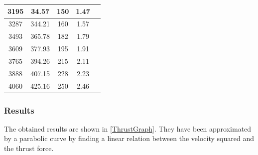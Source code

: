 \begin{table}[H]
\begin{tabular}{|c|c|c|c|p{4.3cm}|}
		\hline%
		3195 						       &  34.57			           & 150                      & 1.47         \\
		\hline%
		3287                               &  344.21  			               & 160                      & 1.57         \\
		\hline%
		3493                               &  365.78                          & 182                      & 1.79         \\
		\hline%
		3609 					           &  377.93	                       & 195                      & 1.91         \\
		\hline%
		3765 						       &  394.26	                   & 215                      & 2.11         \\
		\hline%
		3888 						       &  407.15		                   & 228                      & 2.23         \\
		\hline%
		4060 						       &  425.16	                   & 250                      & 2.46         \\
		\hline%
				
	\end{tabular}
\end{table}
\subsubsection{Results}
The obtained results are shown in \autoref{ThrustGraph}. They have been approximated by a parabolic curve by finding a linear relation between the velocity squared and the thrust force.

